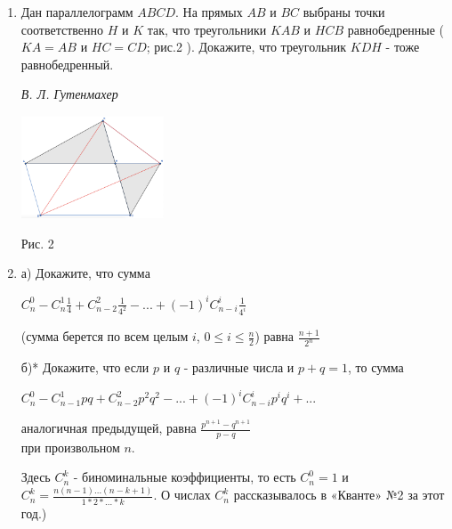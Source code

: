 \begin{enumerate}[label={М}{{\arabic*}}{.}, font=\bfseries, wide,  labelindent=0pt, noitemsep]
\begin{tabular}{ cc }
\begin{tabular}{ |c|c|c|c| }
 \hline
 2 & 6 & 40 & 84\\
 \hline
\end{tabular} \\
\end{tabular} \\

Рис. 1
\newline

Решите эту задачу: \par
	а) для $m = n = 2$ (для таблицы $2*2$); \par
	б) для $m = 2$ и произвольного n (для таблицы из двух строк); \par
	в)* для любых натуральных $m$ и $n$. \par


    \item Дан параллелограмм $ABCD$. На прямых $AB$ и $BC$ выбраны точки соответственно $H$ и $K$ так, что треугольники $KAB$ и $HCB$ равнобедренные ($KA = AB$ и $HC = CD$; рис.2 ). Докажите, что треугольник $KDH$ - тоже равнобедренный. 
    
    \begin{flushright}
     \textit{В. Л. Гутенмахер}
    \end{flushright}
    
    \begin{center}
         \includegraphics[width=160px]{polygon.png}
    \end{center}
   

Рис. 2
\newline
    \item а) Докажите, что сумма
    \begin{center}
    $C_{n}^{0} - C_{n}^{1} \frac{1}{4} + C_{n-2}^{2} \frac{1}{4^2} - ... + (-1)^i C_{n-i}^{i} \frac{1}{4^i}$
    \end{center}
    (сумма берется по всем целым $i$, $0 \leq i \leq \frac{n}{2}$) равна $\frac{n+1}{2^n}$ 
    \par
    б)* Докажите, что если $p$ и $q$ - различные числа и $p + q = 1$, то сумма 
    \begin{center}
    $C_{n}^{0}-C_{n-1}^{1}pq+C_{n-2}^{2}p^2q^2 - ... + (-1)^iC_{n-i}^{i}p^iq^i+...$
    \end{center}
    аналогичная предыдущей, равна $\frac{p^{n+1}-q^{n+1}}{p-q}$ \\
    при произвольном $n$. \par
    Здесь $C_{n}^{k}$ - биноминальные коэффициенты, то есть $C_{n}^{0} = 1$ и $C_{n}^{k} = \frac{n(n-1)...(n-k+1)}{1*2*...*k}$. О числах $C_{n}^{k}$ рассказывалось в «Кванте» №2 за этот год.) 
    \par


\end{enumerate}
